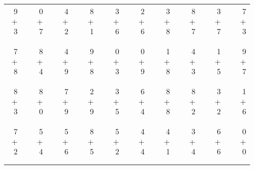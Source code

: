 \documentclass[12pt, letterpaper]{article}
\begin{document}
\begin{tabular}{rrrrrrrrrrrrrrrrrrr}
9 & & 0 & & 4 & & 8 & & 3 & & 2 & & 3 & & 8 & & 3 & & 7\\
$+$ 3 & & $+$ 7 & & $+$ 2 & & $+$ 1 & & $+$ 6 & & $+$ 6 & & $+$ 8 & & $+$ 7 & & $+$ 7 & & $+$ 3\\
\cline{1-1} \cline{3-3} \cline{5-5} \cline{7-7} \cline{9-9} \cline{11-11} \cline{13-13} \cline{15-15} \cline{17-17} \cline{19-19} \\ \\
7 & & 8 & & 4 & & 9 & & 0 & & 0 & & 1 & & 4 & & 1 & & 9\\
$+$ 8 & & $+$ 4 & & $+$ 9 & & $+$ 8 & & $+$ 3 & & $+$ 9 & & $+$ 8 & & $+$ 3 & & $+$ 5 & & $+$ 7\\
\cline{1-1} \cline{3-3} \cline{5-5} \cline{7-7} \cline{9-9} \cline{11-11} \cline{13-13} \cline{15-15} \cline{17-17} \cline{19-19} \\ \\
8 & & 8 & & 7 & & 2 & & 3 & & 6 & & 8 & & 8 & & 3 & & 1\\
$+$ 3 & & $+$ 0 & & $+$ 9 & & $+$ 9 & & $+$ 5 & & $+$ 4 & & $+$ 8 & & $+$ 2 & & $+$ 2 & & $+$ 6\\
\cline{1-1} \cline{3-3} \cline{5-5} \cline{7-7} \cline{9-9} \cline{11-11} \cline{13-13} \cline{15-15} \cline{17-17} \cline{19-19} \\ \\
7 & & 5 & & 5 & & 8 & & 5 & & 4 & & 4 & & 3 & & 6 & & 0\\
$+$ 2 & & $+$ 4 & & $+$ 6 & & $+$ 5 & & $+$ 2 & & $+$ 4 & & $+$ 1 & & $+$ 4 & & $+$ 6 & & $+$ 0\\
\cline{1-1} \cline{3-3} \cline{5-5} \cline{7-7} \cline{9-9} \cline{11-11} \cline{13-13} \cline{15-15} \cline{17-17} \cline{19-19} \\ \\
\end{tabular}
\newpage
\end{document}
